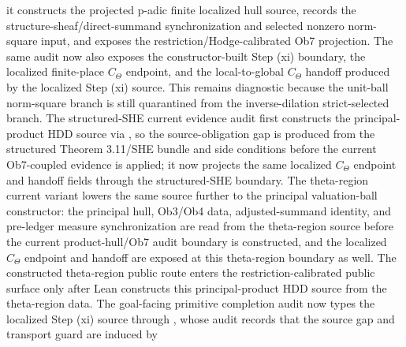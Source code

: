 \begin{proposition}
  it constructs the projected p-adic finite localized hull source, records the
  structure-sheaf/direct-summand synchronization and selected nonzero
  norm-square input, and exposes the restriction/Hodge-calibrated Ob7
  projection.  The same audit now also exposes the constructor-built Step (xi)
  boundary, the localized finite-place \(C_\Theta\) endpoint, and the
  local-to-global \(C_\Theta\) handoff produced by the localized Step (xi)
  source.  This remains diagnostic because the unit-ball norm-square branch
  is still quarantined from the inverse-dilation strict-selected branch.  The
  structured-SHE current evidence audit
  first constructs the principal-product HDD source via
  ,
  so the source-obligation gap is produced from the structured
  Theorem 3.11/SHE bundle and side conditions before the current Ob7-coupled
  evidence is applied; it now projects the same localized \(C_\Theta\) endpoint
  and handoff fields through the structured-SHE boundary.  The theta-region
  current variant
  lowers the same source further to the principal valuation-ball constructor:
  the principal hull, Ob3/Ob4 data, adjusted-summand identity, and pre-ledger
  measure synchronization are read from the theta-region source before the
  current product-hull/Ob7 audit boundary is constructed, and the localized
  \(C_\Theta\) endpoint and handoff are exposed at this theta-region boundary as
  well.  The constructed theta-region public route
  enters the restriction-calibrated public surface only after Lean constructs
  this principal-product HDD source from the theta-region data.  The goal-facing
  primitive completion audit
  now types the localized Step (xi) source through
  ,
  whose audit records that the source gap and transport guard are induced by

\end{proposition}
